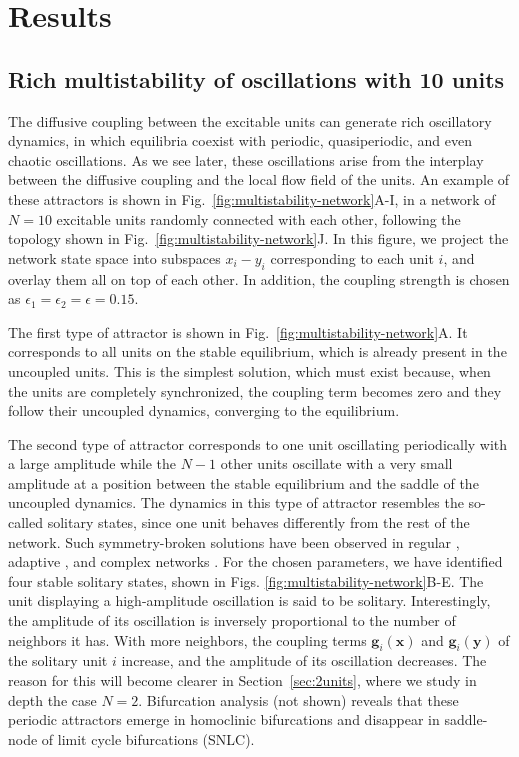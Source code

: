 \section{Results}\label{sec:results}

\subsection{Rich multistability of oscillations with 10 units}
The diffusive coupling between the excitable units can generate rich oscillatory dynamics, in which equilibria coexist with periodic, quasiperiodic, and even chaotic oscillations. As we see later, these oscillations arise from the interplay between the diffusive coupling and the local flow field of the units. An example of these attractors is shown in Fig.~\ref{fig:multistability-network}A-I, in a network of $N=10$ excitable units randomly connected with each other, following the topology shown in Fig.~\ref{fig:multistability-network}J. In this figure, we project the network state space into subspaces $x_i - y_i$ corresponding to each unit $i$, and overlay them all on top of each other.  In addition, the coupling strength is chosen as $\epsilon_1 = \epsilon_2 = \epsilon = 0.15$. 

The first type of attractor is shown in Fig.~\ref{fig:multistability-network}A. It corresponds to all units on the stable equilibrium, which is already present in the uncoupled units. This is the simplest solution, which must exist because, when the units are completely synchronized, the coupling term becomes zero and they follow their uncoupled dynamics, converging to the equilibrium.

The second type of attractor corresponds to one unit oscillating periodically with a large amplitude while the $N-1$ other units oscillate with a very small amplitude at a position between the stable equilibrium and the saddle of the uncoupled dynamics. The dynamics in this type of attractor resembles the so-called solitary states, since one unit behaves differently from the rest of the network. Such symmetry-broken solutions have been observed in regular \cite{semenova2018mechanism, jaros2018solitary, rybalova2019solitary,hellmann2020network}, adaptive \cite{berner2020solitary}, and complex networks \cite{schulen2022solitary}. For the chosen parameters, we have identified four stable solitary states, shown in Figs. \ref{fig:multistability-network}B-E. The unit displaying a high-amplitude oscillation is said to be solitary. Interestingly, the amplitude of its oscillation is inversely proportional to the number of neighbors it has. With more neighbors, the coupling terms $\mathbf{g}_i(\mathbf{x})$ and $\mathbf{g}_i(\mathbf{y})$ of the solitary unit $i$ increase, and the amplitude of its oscillation decreases. The reason for this will become clearer in Section~\ref{sec:2units}, where we study in depth the case $N=2$. Bifurcation analysis (not shown) reveals that these periodic attractors emerge in homoclinic bifurcations and disappear in saddle-node of limit cycle bifurcations (SNLC).


